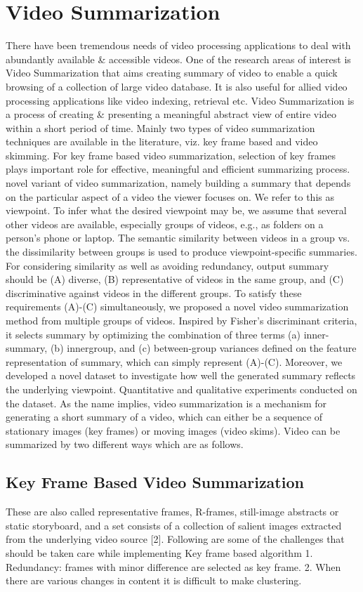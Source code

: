 \chapter{Video Summarization}
There have been tremendous needs of video processing applications to deal with abundantly available &
accessible videos. One of the research areas of interest is Video Summarization that aims creating summary of video to
enable a quick browsing of a collection of large video database. It is also useful for allied video processing applications
like video indexing, retrieval etc. Video Summarization is a process of creating & presenting a meaningful abstract
view of entire video within a short period of time. Mainly two types of video summarization techniques are available in
the literature, viz. key frame based and video skimming. For key frame based video summarization, selection of key
frames plays important role for effective, meaningful and efficient summarizing process.
novel variant of video summarization, namely building a summary that depends on the
particular aspect of a video the viewer focuses on. We refer to this as viewpoint. To infer what the desired viewpoint
may be, we assume that several other videos are available,
especially groups of videos, e.g., as folders on a person’s
phone or laptop. The semantic similarity between videos
in a group vs. the dissimilarity between groups is used
to produce viewpoint-specific summaries. For considering
similarity as well as avoiding redundancy, output summary
should be (A) diverse, (B) representative of videos in the
same group, and (C) discriminative against videos in the
different groups. To satisfy these requirements (A)-(C) simultaneously, we proposed a novel video summarization
method from multiple groups of videos. Inspired by Fisher’s
discriminant criteria, it selects summary by optimizing the
combination of three terms (a) inner-summary, (b) innergroup, and (c) between-group variances defined on the feature representation of summary, which can simply represent
(A)-(C). Moreover, we developed a novel dataset to investigate how well the generated summary reflects the underlying viewpoint. Quantitative and qualitative experiments
conducted on the dataset.
As the name implies, video summarization is a mechanism for generating a short summary of a video, which can
either be a sequence of stationary images (key frames) or moving images (video skims). Video can be summarized
by two different ways which are as follows.
\section{Key Frame Based Video Summarization}
These are also called representative frames, R-frames, still-image abstracts or static storyboard, and a set consists of
a collection of salient images extracted from the underlying video source [2]. Following are some of the challenges that
should be taken care while implementing Key frame based algorithm
1. Redundancy: frames with minor difference are selected as key frame.
2. When there are various changes in content it is difficult to make clustering.
